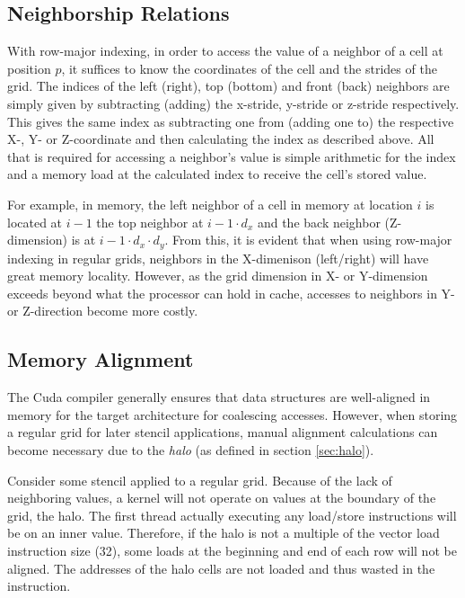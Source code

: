 \subsection{Neighborship Relations}

With row-major indexing, in order to access the value of a neighbor of a cell at position $p$, it suffices to know the coordinates of the cell and the strides of the grid. The indices of the left (right), top (bottom) and front (back) neighbors are simply given by subtracting (adding) the x-stride, y-stride or z-stride respectively. This gives the same index as subtracting one from (adding one to) the respective X-, Y- or Z-coordinate and then calculating the index as described above. All that is required for accessing a neighbor's value is simple arithmetic for the index and a memory load at the calculated index to receive the cell's stored value.

For example, in memory, the left neighbor of a cell in memory at location $i$ is located at $i-1$ the top neighbor at $i-1\cdot d_x$ and the back neighbor (Z-dimension) is at $i-1\cdot d_x\cdot d_y$. From this, it is evident that when using row-major indexing in regular grids, neighbors in the X-dimenison (left/right) will have great memory locality. However, as the grid dimension in X- or Y-dimension exceeds beyond what the processor can hold in cache, accesses to neighbors in Y- or Z-direction become more costly. 

\subsection{Memory Alignment}

\label{sec:regular-memory-alignment}
The Cuda compiler generally ensures that data structures are well-aligned in memory for the target architecture for coalescing accesses. However, when storing a regular grid for later stencil applications, manual alignment calculations can become necessary due to the \emph{halo} (as defined in section \ref{sec:halo}). 

Consider some stencil applied to a regular grid. Because of the lack of neighboring values, a kernel will not operate on values at the boundary of the grid, the halo. The first thread actually executing any load/store instructions will be on an inner value. Therefore, if the halo is not a multiple of the vector load instruction size (32), some loads at the beginning and end of each row will not be aligned. The addresses of the halo cells are not loaded and thus wasted in the instruction.

